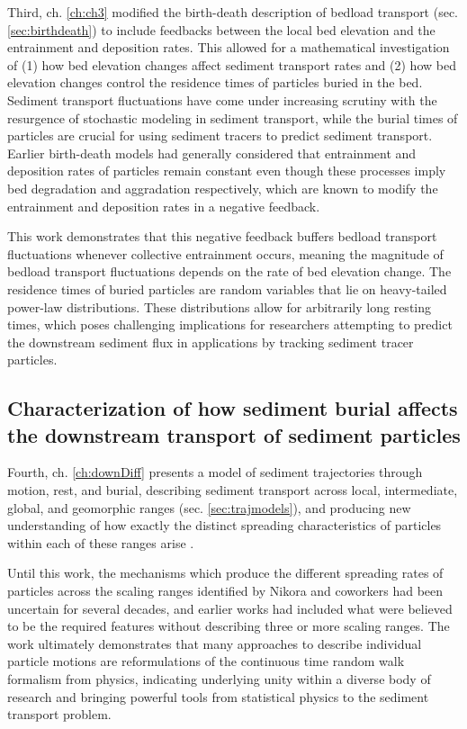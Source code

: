 Third, ch. \ref{ch:ch3} modified the birth-death description of bedload transport (sec. \ref{sec:birthdeath}) to include feedbacks between the local bed elevation and the entrainment and deposition rates.
This allowed for a mathematical investigation of (1) how bed elevation changes affect sediment transport rates and (2) how bed elevation changes control the residence times of particles buried in the bed.
Sediment transport fluctuations have come under increasing scrutiny with the resurgence of stochastic modeling in sediment transport, while the burial times of particles are crucial for using sediment tracers to predict sediment transport.
Earlier birth-death models had generally considered that entrainment and deposition rates of particles remain constant even though these processes imply bed degradation and aggradation respectively, which are known to modify the entrainment and deposition rates in a negative feedback.

This work demonstrates that this negative feedback buffers bedload transport fluctuations whenever collective entrainment occurs, meaning the magnitude of bedload transport fluctuations depends on the rate of bed elevation change. The residence times of buried particles are random variables that lie on heavy-tailed power-law distributions. These distributions allow for arbitrarily long resting times, which poses challenging implications for researchers attempting to predict the downstream sediment flux in applications by tracking sediment tracer particles. 

\subsection{Characterization of how sediment burial affects the downstream transport of sediment particles}

Fourth, ch. \ref{ch:downDiff} presents a model of sediment trajectories through motion, rest, and burial, describing sediment transport across local, intermediate, global, and geomorphic ranges (sec. \ref{sec:trajmodels}), and producing new understanding of how exactly the distinct spreading characteristics of particles within each of these ranges arise \citep[e.g][]{Pretzlav2021}.

Until this work, the mechanisms which produce the different spreading rates of particles across the scaling ranges identified by Nikora and coworkers had been uncertain for several decades, and earlier works had included what were believed to be the required features without describing three or more scaling ranges. 
The work ultimately demonstrates that many approaches to describe individual particle motions are reformulations of the continuous time random walk formalism from physics, indicating underlying unity within a diverse body of research and bringing powerful tools from statistical physics to the sediment transport problem.


